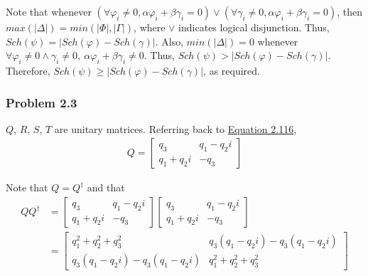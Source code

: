 \begin{enumerate}
    Note that whenever
    $(\forall \varphi_i \neq 0, \alpha \varphi_i + \beta \gamma_i = 0) \lor
    (\forall \gamma_i \neq 0, \alpha \varphi_i + \beta \gamma_i = 0)$,
    then $max(|\Delta|) = min(|\Phi|, |\Gamma|)$,
    where $\lor$ indicates logical disjunction.
    Thus, $Sch(\psi) = |Sch(\varphi) - Sch(\gamma)|$.
    Also, $min(|\Delta|) = 0$ whenever
    $\forall \varphi_i \neq 0 \land \gamma_i \neq 0,\ \alpha \varphi_i + \beta \gamma_i \neq 0$.
    Thus, $Sch(\psi) > |Sch(\varphi) - Sch(\gamma)|$.
    Therefore, $Sch(\psi) \geq |Sch(\varphi) - Sch(\gamma)|$, as required.
    
\end{enumerate}


\subsubsection{Problem 2.3}
\label{sec:nielsen-and-chuang-problem-2-3}

$Q$, $R$, $S$, $T$ are unitary matrices.
Referring back to
\hyperref[sec:nielsen-and-chuang-equation-2-116]{Equation 2.116},
%
\begin{align}
    Q = \left[ \begin{matrix}
        q_3 & q_1 - q_2i \\
        q_1 + q_2i & - q_3
        \end{matrix} \right]
\end{align}

Note that $Q = Q^\dagger$ and that
%
\begin{align}
    Q Q^\dagger &= \left[ \begin{matrix}
        q_3 & q_1 - q_2i \\
        q_1 + q_2i & - q_3
        \end{matrix} \right]
        \left[ \begin{matrix}
        q_3 & q_1 - q_2i \\
        q_1 + q_2i & - q_3
        \end{matrix} \right] \\[5pt]
    &= \left[ \begin{matrix}
        q_1^2 + q_2^2 + q_3^2 & q_3(q_1 - q_2i) - q_3(q_1 - q_2i) \\
        q_3(q_1 - q_2i) - q_3(q_1 - q_2i) & q_1^2 + q_2^2 + q_3^2
        \end{matrix} \right]
\end{align}


